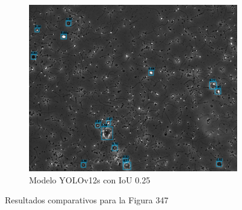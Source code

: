 \documentclass[12pt,a4paper,onecolumn,oneside]{report}
\begin{document}
\begin{figure}[H]
  \vspace{0.3cm}
  \begin{subfigure}[b]{0.48\textwidth}
    \centering
    \includegraphics[width=\textwidth]{figuras/evaluacion_cualitativa/347/347_v12_IoU0.25.jpg}
    \caption{Modelo YOLOv12s con IoU 0.25}
    \label{figyolov12s_IoU0.25_image_347}
  \end{subfigure}
  
  \caption{Resultados comparativos para la Figura 347}
  \label{fig:347}
\end{figure}
\end{document}
